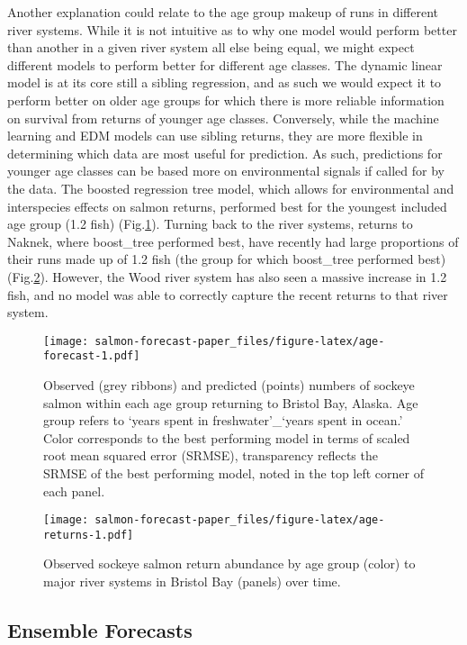 \documentclass[
]{article}
\begin{document}
Another explanation could relate to the age group makeup of runs in different river systems. While it is not intuitive as to why one model would perform better than another in a given river system all else being equal, we might expect different models to perform better for different age classes. The dynamic linear model is at its core still a sibling regression, and as such we would expect it to perform better on older age groups for which there is more reliable information on survival from returns of younger age classes. Conversely, while the machine learning and EDM models can use sibling returns, they are more flexible in determining which data are most useful for prediction. As such, predictions for younger age classes can be based more on environmental signals if called for by the data. The boosted regression tree model, which allows for environmental and interspecies effects on salmon returns, performed best for the youngest included age group (1.2 fish) (Fig.\ref{fig:age-forecast}). Turning back to the river systems, returns to Naknek, where boost\_tree performed best, have recently had large proportions of their runs made up of 1.2 fish (the group for which boost\_tree performed best) (Fig.\ref{fig:age-returns}). However, the Wood river system has also seen a massive increase in 1.2 fish, and no model was able to correctly capture the recent returns to that river system.

\begin{figure}
\centering
\texttt{[image: salmon-forecast-paper\_files/figure-latex/age-forecast-1.pdf]}
\caption{\label{fig:age-forecast}Observed (grey ribbons) and predicted (points) numbers of sockeye salmon within each age group returning to Bristol Bay, Alaska. Age group refers to `years spent in freshwater'\_`years spent in ocean.' Color corresponds to the best performing model in terms of scaled root mean squared error (SRMSE), transparency reflects the SRMSE of the best performing model, noted in the top left corner of each panel.}
\end{figure}

\begin{figure}
\centering
\texttt{[image: salmon-forecast-paper\_files/figure-latex/age-returns-1.pdf]}
\caption{\label{fig:age-returns}Observed sockeye salmon return abundance by age group (color) to major river systems in Bristol Bay (panels) over time.}
\end{figure}

\hypertarget{ensemble-forecasts}{%
\subsection*{Ensemble Forecasts}\label{ensemble-forecasts}}
\end{document}
